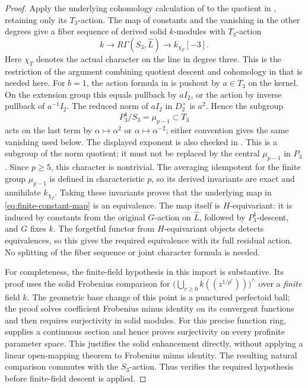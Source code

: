 \documentclass[11pt]{article}
\numberwithin{equation}{section}
\theoremstyle{definition}
\theoremstyle{remark}
\begin{document}
\begin{proof}
Apply the underlying cohomology calculation of
\cite[Proposition~3.6.9]{BMR2026} to the quotient in ,
retaining only its $T_3$-action.  The map of constants and the vanishing
in the other degrees give a fiber sequence of derived solid $k$-modules
with $T_3$-action
\[
 k\longrightarrow R\Gamma(S_3,\widehat L)
   \longrightarrow k_{\chi_T}[-3].
\]
Here $\chi_T$ denotes the actual character on the line in degree three.
This is the restriction of the argument combining quotient descent and cohomology in
\cite[Theorem~3.6.10]{BMR2026} that is needed here.  For $b=1$, the action
formula in  is pushout by $a\in T_3$ on the kernel.
On the extension group this equals pullback by $aI_2$, or the
action by inverse pullback of $a^{-1}I_2$.  The reduced norm of $aI_2$
in $D_2^\times$ is $a^2$.  Hence the subgroup
\[
 P_3^1/S_3=\mu_{p-1}\subset T_3
\]
acts on the last term by $\alpha\mapsto\alpha^{2}$ or
$\alpha\mapsto\alpha^{-2}$; either convention gives the same vanishing
used below.  The displayed exponent is also checked in
\cite[Lemma 5.2.5]{BMR2026}.  This is a subgroup of the norm quotient;
it must not be replaced by the central $\mu_{p-1}$ in $P_3$.
Since $p\ge5$, this character is nontrivial.  The averaging idempotent
for the finite group $\mu_{p-1}$ is defined in characteristic $p$, so its
derived invariants are exact and annihilate $k_{\chi_T}$.
Taking these invariants proves that the underlying map in
\eqref{eq:finite-constant-map} is an equivalence.  The map itself is
$H$-equivariant: it is induced by constants from the original $G$-action
on $\widehat L$, followed by $P_3^1$-descent, and $G$ fixes $k$.
The forgetful functor from $H$-equivariant objects detects equivalences,
so this gives the required equivalence with its full residual action.
No splitting of the fiber sequence or joint character formula is needed.

For completeness, the finite-field hypothesis in this import is
substantive.  Its proof uses the solid Frobenius comparison
\cite[Lemma 3.6.3 and Corollary 3.6.8]{BMR2026} for
$\bigl(\bigcup_{r\ge0}k((z^{1/p^r}))\bigr)^{\wedge}$
over a \emph{finite} field $k$.
The geometric base change of this point is a punctured perfectoid ball;
the proof solves coefficient Frobenius minus identity on its convergent functions
and then requires surjectivity in solid modules.  For this precise
function ring,  supplies a continuous
section and hence proves surjectivity on every profinite parameter space.
This justifies the solid enhancement directly, without applying a
linear open-mapping theorem to Frobenius minus identity.  The resulting natural
comparison commutes with the $S_3$-action.  Thus
 verifies the required hypothesis before finite-field
descent is applied.


\end{proof}
\end{document}
